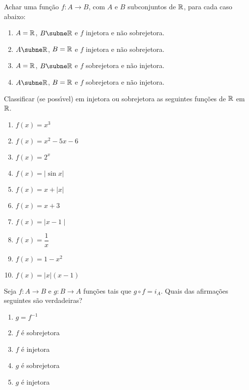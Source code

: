 \documentclass[12pt]{exam}
\begin{document}
\vspace{.3cm}

\questao Achar uma fun{\c c}{\~a}o $f : A \to B$, com $A$ e $B$ subconjuntos de $\mathbb{R}$, para cada caso abaixo:
\begin{enumerate}[label={\alph*})]
	\item $A = \mathbb{R}$, $B \subne \real$ e $f$ injetora e n{\~a}o sobrejetora.
	\item $A \subne \real$, $B = \mathbb{R}$ e $f$ injetora e n{\~a}o sobrejetora.
	\item $A = \mathbb{R}$, $B \subne \real$ e $f$ sobrejetora e n{\~a}o injetora.
	\item $A \subne \real$, $B = \mathbb{R}$ e $f$ sobrejetora e n{\~a}o injetora.
\end{enumerate}

\newpage

\questao Classificar (se poss{\'\i}vel) em injetora ou sobrejetora as seguintes fun{\c c}{\~o}es de $\mathbb{R}$ em $\mathbb{R}$.

\begin{multicols}{2}
	\begin{enumerate}[label={\alph*})]
		\item $f(x) = x^3$
		\item $f(x) = x^2 - 5x - 6$
		\item $f(x) = 2^x$
		\item $f(x) = | \sin x |$
		\item $f(x) = x + | x |$
		\item $f(x) = x + 3$
		\item $f(x) = \mid x - 1\mid$
		\item $f(x) = \dfrac{1}{x}$
		\item $f(x) = 1 - x^2$
		\item $f(x) = |x|(x - 1)$
	\end{enumerate}
\end{multicols}

\vspace{.3cm}

\questao Seja $f : A \to B$ e $g : B \to A$ funções tais que $g \circ f = i_A$. Quais das afirmações seguintes são verdadeiras?
\begin{enumerate}[label={\alph*})]
	\item $g = f^{-1}$
	\item $f$ é sobrejetora
	\item $f$ é injetora
	\item $g$ é sobrejetora
	\item $g$ é injetora
\end{enumerate}
\end{document}
